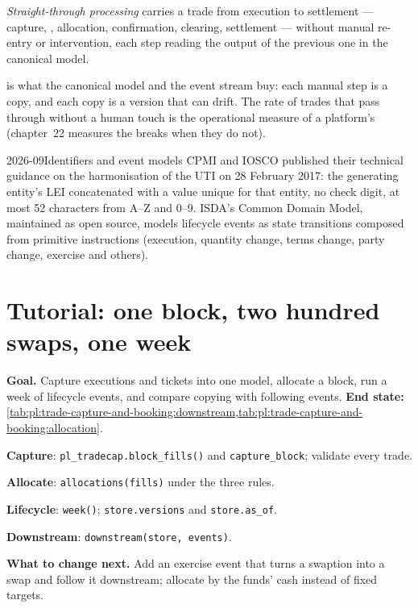 \begin{definition}\label{def:pl:trade-capture-and-booking:stp}
\emph{Straight-through processing} carries a trade from execution to settlement --- capture, ,
allocation, confirmation, clearing, settlement --- without manual re-entry or intervention, each step reading the output of the previous one in
the canonical model.
\end{definition}

 is what the canonical model and the event stream buy: each manual step is a copy, and each copy is a version that can
drift. The rate of trades that pass through without a human touch is the operational measure of a platform's  (chapter~22 measures
the breaks when they do not).

\begin{dated}{2026-09}{Identifiers and event models}\label{dat:pl:trade-capture-and-booking:standards}
CPMI and IOSCO published their technical guidance on the harmonisation of the UTI on 28 February 2017: the generating entity's LEI concatenated
with a value unique for that entity, no check digit, at most 52 characters from A--Z and 0--9. ISDA's Common Domain Model, maintained as open
source, models lifecycle events as state transitions composed from primitive instructions (execution, quantity change, terms change, party
change, exercise and others).
\end{dated}

\section{Tutorial: one block, two hundred swaps, one week}\label{tut:pl:trade-capture-and-booking:tut}

\begin{tutorial}
\textbf{Goal.} Capture executions and tickets into one model, allocate a block, run a week of lifecycle events, and compare copying with
following events. \textbf{End state:} \cref{tab:pl:trade-capture-and-booking:downstream,tab:pl:trade-capture-and-booking:allocation}.
\begin{tutsteps}
\item \textbf{Capture}: \texttt{pl\_tradecap.block\_fills()} and \texttt{capture\_block}; validate every trade.
\item \textbf{Allocate}: \texttt{allocations(fills)} under the three rules.
\item \textbf{Lifecycle}: \texttt{week()}; \texttt{store.versions} and \texttt{store.as\_of}.
\item \textbf{Downstream}: \texttt{downstream(store, events)}.
\end{tutsteps}
\textbf{What to change next.} Add an exercise event that turns a swaption into a swap and follow it downstream; allocate by the funds' cash
instead of fixed targets.
\end{tutorial}

